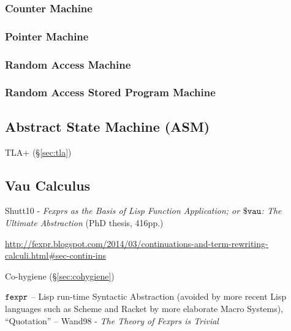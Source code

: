 \subsubsection{Counter Machine}

\subsubsection{Pointer Machine}

\subsubsection{Random Access Machine}

\subsubsection{Random Access Stored Program Machine}



\subsection{Abstract State Machine (ASM)}\label{sec:asm}

TLA+ (\S\ref{sec:tla})



\subsection{Vau Calculus}\label{sec:vau_calculus}


Shutt10 - \emph{Fexprs as the Basis of Lisp Function Application; or
  $\mathtt{\$vau}$: The Ultimate Abstraction} (PhD thesis, 416pp.)

\url{http://fexpr.blogspot.com/2014/03/continuations-and-term-rewriting-calculi.html#sec-contin-ins}

Co-hygiene (\S\ref{sec:cohygiene})

$\mathtt{fexpr}$ -- Lisp run-time Syntactic Abstraction (avoided by more
recent Lisp languages such as Scheme and Racket by more elaborate
Macro Systems), ``Quotation'' -- Wand98 - \emph{The Theory of Fexprs is Trivial}

